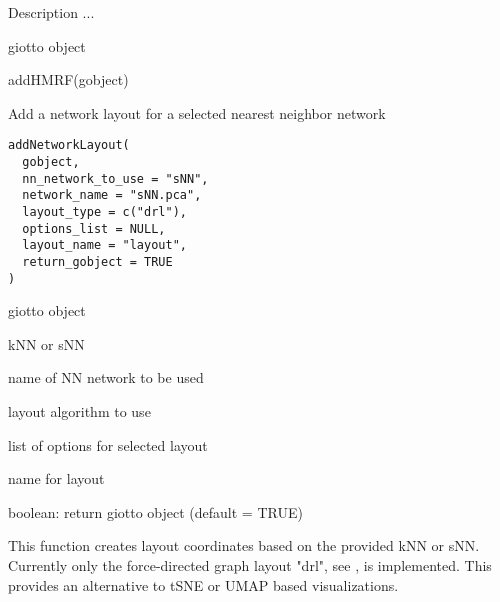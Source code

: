\documentclass[a4paper]{book}
\begin{document}
%
\begin{Details}\relax
Description ...
\end{Details}
%
\begin{Value}
giotto object
\end{Value}
%
\begin{Examples}
\begin{ExampleCode}
    addHMRF(gobject)
\end{ExampleCode}
\end{Examples}
%
\begin{Description}\relax
Add a network layout for a selected nearest neighbor network
\end{Description}
%
\begin{Usage}
\begin{verbatim}
addNetworkLayout(
  gobject,
  nn_network_to_use = "sNN",
  network_name = "sNN.pca",
  layout_type = c("drl"),
  options_list = NULL,
  layout_name = "layout",
  return_gobject = TRUE
)
\end{verbatim}
\end{Usage}
%
\begin{Arguments}
\begin{ldescription}
\item[\code{gobject}] giotto object

\item[\code{nn\_network\_to\_use}] kNN or sNN

\item[\code{network\_name}] name of NN network to be used

\item[\code{layout\_type}] layout algorithm to use

\item[\code{options\_list}] list of options for selected layout

\item[\code{layout\_name}] name for layout

\item[\code{return\_gobject}] boolean: return giotto object (default = TRUE)
\end{ldescription}
\end{Arguments}
%
\begin{Details}\relax
This function creates layout coordinates based on the provided kNN or sNN.
Currently only the force-directed graph layout "drl", see ,
is implemented. This provides an alternative to tSNE or UMAP based visualizations.
\end{Details}
\end{document}
